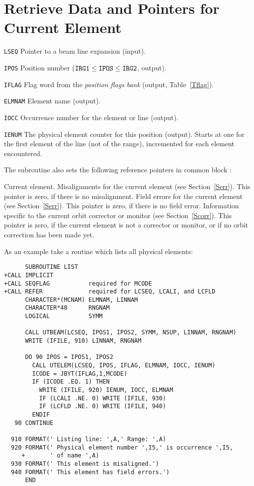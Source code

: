 \section{Retrieve Data and Pointers for Current Element}
\label{UTELEM}
\begin{mylist}
\item[\tt LSEQ]
Pointer to a beam line expansion (input).
\item[\tt IPOS]
Position number
($\hbox{\tt IRG1} \le \hbox{\tt IPOS} \le \hbox{\tt IRG2}$, output).
\item[\tt IFLAG]
Flag word from the {\em position flags bank}
(output, Table~\ref{Tflag}).
\item[\tt ELMNAM]
Element name (output).
\item[\tt IOCC]
Occurrence number for the element or line  (output).
\item[\tt IENUM]
The physical element counter for this position (output).
Starts at one for the first element of the line (not of the range),
incremented for each element encountered.
\end{mylist}
The subroutine  also sets the following reference
pointers in common block :
\begin{mylist}
Current element.
Misalignments for the current element (see Section~\ref{Serr}).
This pointer is zero, if there is no misalignment.
Field errors for the current element (see Section~\ref{Serr}).
This pointer is zero, if there is no field error.
Information specific to the current orbit corrector or monitor
(see Section~\ref{Scorr}).
This pointer is zero, if the current element is not a corrector or
monitor,
or if no orbit correction has been made yet.
\end{mylist}

As an example take a routine which lists all physical elements:
\begin{verbatim}
      SUBROUTINE LIST
+CALL IMPLICIT
+CALL SEQFLAG           required for MCODE
+CALL REFER             required for LCSEQ, LCALI, and LCFLD
      CHARACTER*(MCNAM) ELMNAM, LINNAM
      CHARACTER*40      RNGNAM
      LOGICAL           SYMM
 
      CALL UTBEAM(LCSEQ, IPOS1, IPOS2, SYMM, NSUP, LINNAM, RNGNAM)
      WRITE (IFILE, 910) LINNAM, RNGNAM
 
      DO 90 IPOS = IPOS1, IPOS2
        CALL UTELEM(LCSEQ, IPOS, IFLAG, ELMNAM, IOCC, IENUM)
        ICODE = JBYT(IFLAG,1,MCODE)
        IF (ICODE .EQ. 1) THEN
          WRITE (IFILE, 920) IENUM, IOCC, ELMNAM
          IF (LCALI .NE. 0) WRITE (IFILE, 930)
          IF (LCFLD .NE. 0) WRITE (IFILE, 940)
        ENDIF
   90 CONTINUE
 
  910 FORMAT(' Listing line: ',A,' Range: ',A)
  920 FORMAT(' Physical element number ',I5,' is occurrence ',I5,
     +       ' of name ',A)
  930 FORMAT(' This element is misaligned.')
  940 FORMAT(' This element has field errors.')
      END
\end{verbatim} 

